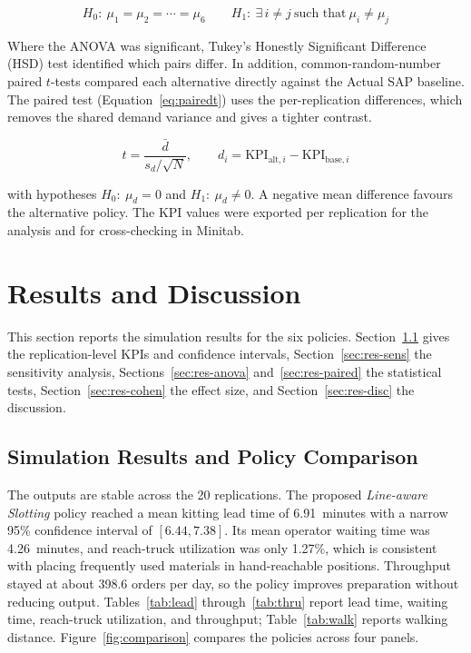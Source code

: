 \documentclass[conference]{IEEEtran}
\newcommand{\policy}[1]{\textit{#1}}
\begin{document}
\begin{equation}
\label{eq:anovah}
H_0:\ \mu_1=\mu_2=\cdots=\mu_6
\qquad
H_1:\ \exists\, i\neq j \ \text{such that}\ \mu_i\neq\mu_j
\end{equation}

Where the ANOVA was significant, Tukey's Honestly Significant Difference (HSD)
test identified which pairs differ. In addition, common-random-number paired
$t$-tests compared each alternative directly against the Actual SAP baseline.
The paired test (Equation~\eqref{eq:pairedt}) uses the per-replication
differences, which removes the shared demand variance and gives a tighter
contrast.

\begin{equation}
\label{eq:pairedt}
t = \frac{\bar{d}}{s_d/\sqrt{N}}, \qquad
d_i = \mathrm{KPI}_{\text{alt},i} - \mathrm{KPI}_{\text{base},i}
\end{equation}

\noindent with hypotheses $H_0:\ \mu_d=0$ and $H_1:\ \mu_d\neq0$. A negative
mean difference favours the alternative policy. The KPI values were exported
per replication for the analysis and for cross-checking in Minitab.

\section{Results and Discussion}
\label{sec:results}
This section reports the simulation results for the six policies.
Section~\ref{sec:res-comp} gives the replication-level KPIs and confidence
intervals, Section~\ref{sec:res-sens} the sensitivity analysis,
Sections~\ref{sec:res-anova} and~\ref{sec:res-paired} the statistical tests,
Section~\ref{sec:res-cohen} the effect size, and Section~\ref{sec:res-disc}
the discussion.

\subsection{Simulation Results and Policy Comparison}
\label{sec:res-comp}
The outputs are stable across the 20 replications. The proposed
\policy{Line-aware Slotting} policy reached a mean kitting lead time of
6.91~minutes with a narrow 95\% confidence interval of $[6.44, 7.38]$. Its
mean operator waiting time was 4.26~minutes, and reach-truck utilization was
only 1.27\%, which is consistent with placing frequently used materials in
hand-reachable positions. Throughput stayed at about 398.6 orders per day, so
the policy improves preparation without reducing output. Tables~\ref{tab:lead}
through~\ref{tab:thru} report lead time, waiting time, reach-truck
utilization, and throughput; Table~\ref{tab:walk} reports walking distance.
Figure~\ref{fig:comparison} compares the policies across four panels.
\end{document}
